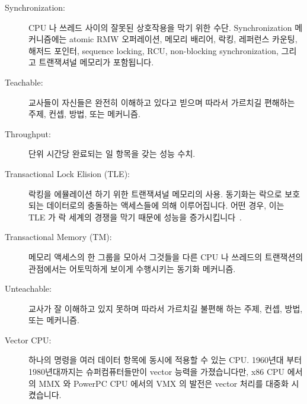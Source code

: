 \begin{description}
\item[Synchronization:]
	CPU 나 쓰레드 사이의 잘못된 상호작용을 막기 위한 수단.
	Synchronization 메커니즘에는 atomic RMW 오퍼레이션, 메모리 배리어,
	락킹, 레퍼런스 카운팅, 해저드 포인터, sequence locking, RCU,
	non-blocking synchronization, 그리고 트랜잭셔널 메모리가 포함됩니다.
\item[Teachable:]
	교사들이 자신들은 완전히 이해하고 있다고 빋으며 따라서 가르치길
	편해하는 주제, 컨셉, 방법, 또는 메커니즘.
\item[Throughput:]
	단위 시간당 완료되는 일 항목을 갖는 성능 수치.
\item[Transactional Lock Elision (TLE):]
	락킹을 에뮬레이션 하기 위한 트랜잭셔널 메모리의 사용.
	동기화는 락으로 보호되는 데이터로의 충돌하는 액세스들에 의해
	이루어집니다.
	어떤 경우, 이는 TLE 가 락 세계의 경쟁을 막기 때문에 성능을
	증가시킵니다~\cite{MartinPohlack2011HTM2TLE,Kleen:2014:SEL:2566590.2576793,PascalFelber2016rwlockElision,SeongJaePark2020HTMRCUlock}.

\iffalse

\item[Synchronization:]\index{Synchronization}
	Means for avoiding destructive interactions among CPUs or threads.
	Synchronization mechanisms include atomic RMW operations, memory
	barriers, locking, reference counting, hazard pointers, sequence
	locking, RCU, non-blocking synchronization, and transactional
	memory.
\item[Teachable:]\index{Teachable}
	A topic, concept, method, or mechanism that teachers believe that
	they understand completely and are therefore comfortable teaching.
\item[Throughput:]\index{Throughput}
	A performance metric featuring work items completed per unit time.
\item[Transactional Lock Elision (TLE):]\index{Transactional lock elision (TLE)}
	The use of transactional memory to emulate locking.
	Synchronization is instead carried out by conflicting accesses
	to the data to be protected by the lock.
	In some cases, this can increase performance because TLE
	avoids contention on the lock
	word~\cite{MartinPohlack2011HTM2TLE,Kleen:2014:SEL:2566590.2576793,PascalFelber2016rwlockElision,SeongJaePark2020HTMRCUlock}.

\fi

\item[Transactional Memory (TM):]
	메모리 액세스의 한 그룹을 모아서 그것들을 다른 CPU 나 쓰레드의
	트랜잭션의 관점에서는 어토믹하게 보이게 수행시키는 동기화 메커니즘.
\item[Unteachable:]
	교사가 잘 이해하고 있지 못하며 따라서 가르치길 불편해 하는 주제, 컨셉,
	방법, 또는 메커니즘.
\item[Vector CPU:]
	하나의 명령을 여러 데이터 항목에 동시에 적용할 수 있는 CPU.
	1960년대 부터 1980년대까지는 슈퍼컴퓨터들만이 vector 능력을
	가졌습니다만, x86 CPU 에서의 MMX 와 PowerPC CPU 에서의 VMX 의 발전은
	vector 처리를 대중화 시켰습니다.


\end{description}
